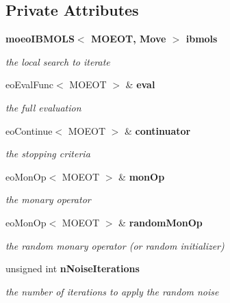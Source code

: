 \subsection*{Private Attributes}
\begin{CompactItemize}
\item 
\bf{moeo\-IBMOLS}$<$ MOEOT, Move $>$ \bf{ibmols}\label{classmoeoIteratedIBMOLS_6b1351f1faa391a1f095d1f9d4dba915}

\begin{CompactList}\small\item\em the local search to iterate \item\end{CompactList}\item 
eo\-Eval\-Func$<$ MOEOT $>$ \& \bf{eval}\label{classmoeoIteratedIBMOLS_7abdd0c1433ec4671522c8d5edc9fe61}

\begin{CompactList}\small\item\em the full evaluation \item\end{CompactList}\item 
eo\-Continue$<$ MOEOT $>$ \& \bf{continuator}\label{classmoeoIteratedIBMOLS_964e5df65c7aa33dd84eed3180d5e0a3}

\begin{CompactList}\small\item\em the stopping criteria \item\end{CompactList}\item 
eo\-Mon\-Op$<$ MOEOT $>$ \& \bf{mon\-Op}\label{classmoeoIteratedIBMOLS_77851daa2f2230000c0012beef3b8558}

\begin{CompactList}\small\item\em the monary operator \item\end{CompactList}\item 
eo\-Mon\-Op$<$ MOEOT $>$ \& \bf{random\-Mon\-Op}\label{classmoeoIteratedIBMOLS_89df3bfa7069c06c7e7cf4b30ccc5535}

\begin{CompactList}\small\item\em the random monary operator (or random initializer) \item\end{CompactList}\item 
unsigned int \bf{n\-Noise\-Iterations}\label{classmoeoIteratedIBMOLS_a50f25daf2847fb9d299ef65baf3bda7}

\begin{CompactList}\small\item\em the number of iterations to apply the random noise \item\end{CompactList}\end{CompactItemize}


